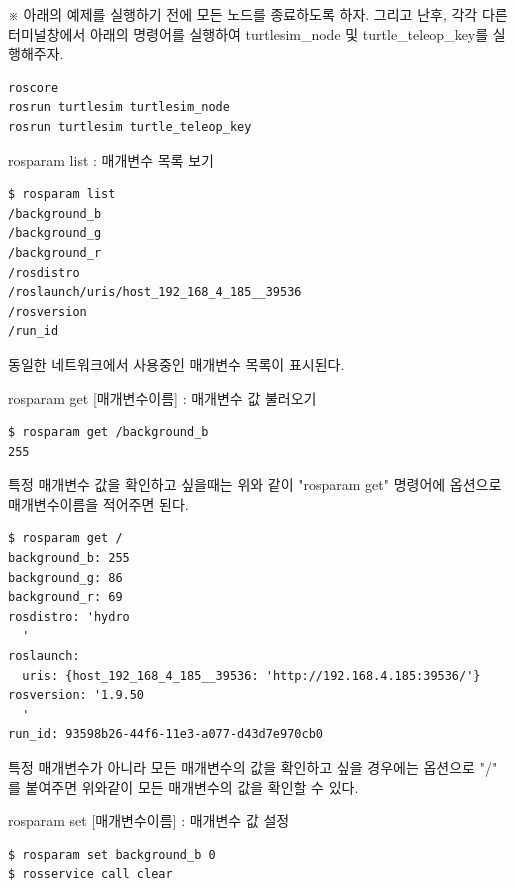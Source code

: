\vspace{\baselineskip}
\noindent
※ 아래의 예제를 실행하기 전에 모든 노드를 종료하도록 하자. 그리고 난후, 각각 다른 터미널창에서 아래의 명령어를 실행하여 turtlesim\_node 및 turtle\_teleop\_key를 실행해주자.

\begin{lstlisting}[language=ROS]
roscore
rosrun turtlesim turtlesim_node 
rosrun turtlesim turtle_teleop_key
\end{lstlisting}

\setcounter{num}{0}

\noindent
{}\circled{\thenum} rosparam list : 매개변수 목록 보기

\begin{lstlisting}[language=ROS]
$ rosparam list
/background_b
/background_g
/background_r
/rosdistro
/roslaunch/uris/host_192_168_4_185__39536
/rosversion
/run_id
\end{lstlisting}

\noindent
동일한 네트워크에서 사용중인 매개변수 목록이 표시된다.

\vspace{\baselineskip}
\noindent
{}\circled{\thenum} rosparam get [매개변수이름] : 매개변수 값 불러오기

\begin{lstlisting}[language=ROS]
$ rosparam get /background_b
255
\end{lstlisting}

\noindent
특정 매개변수 값을 확인하고 싶을때는 위와 같이 "rosparam get" 명령어에 옵션으로 매개변수이름을 적어주면 된다.

\begin{lstlisting}[language=ROS]
$ rosparam get /
background_b: 255
background_g: 86
background_r: 69
rosdistro: 'hydro
  '
roslaunch:
  uris: {host_192_168_4_185__39536: 'http://192.168.4.185:39536/'}
rosversion: '1.9.50
  '
run_id: 93598b26-44f6-11e3-a077-d43d7e970cb0
\end{lstlisting}

\noindent
특정 매개변수가 아니라 모든 매개변수의 값을 확인하고 싶을 경우에는 옵션으로 "/" 를 붙여주면 위와같이 모든 매개변수의 값을 확인할 수 있다.

\vspace{\baselineskip}
\noindent
{}\circled{\thenum} rosparam set [매개변수이름] : 매개변수 값 설정 

\begin{lstlisting}[language=ROS]
$ rosparam set background_b 0
$ rosservice call clear
\end{lstlisting}

